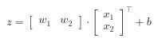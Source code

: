 \documentclass[preview]{standalone}
\begin{document}
\begin{align*}
z = \begin{bmatrix} w_1 & w_2 \end{bmatrix} \cdot \begin{bmatrix} x_1 \\ x_2 \end{bmatrix}^\top + b
\end{align*}
\end{document}
